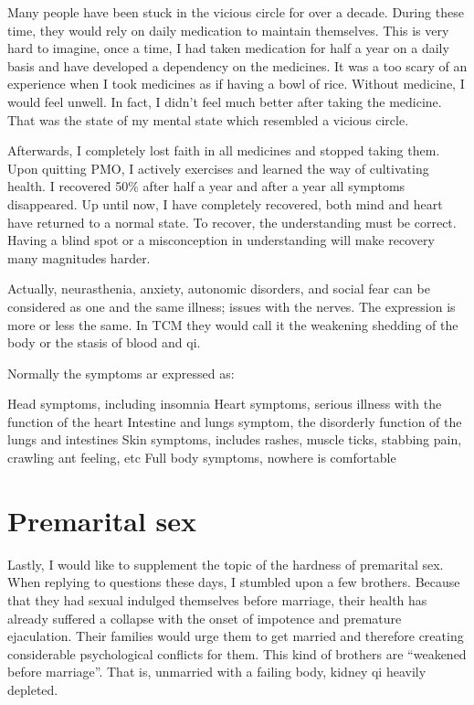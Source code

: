 \documentclass[
]{book}
\begin{document}
Many people have been stuck in the vicious circle for over a decade. During these time, they would rely on daily medication to maintain themselves. This is very hard to imagine, once a time, I had taken medication for half a year on a daily basis and have developed a dependency on the medicines. It was a too scary of an experience when I took medicines as if having a bowl of rice. Without medicine, I would feel unwell. In fact, I didn't feel much better after taking the medicine. That was the state of my mental state which resembled a vicious circle.

Afterwards, I completely lost faith in all medicines and stopped taking them. Upon quitting PMO, I actively exercises and learned the way of cultivating health. I recovered 50\% after half a year and after a year all symptoms disappeared. Up until now, I have completely recovered, both mind and heart have returned to a normal state. To recover, the understanding must be correct. Having a blind spot or a misconception in understanding will make recovery many magnitudes harder.

Actually, neurasthenia, anxiety, autonomic disorders, and social fear can be considered as one and the same illness; issues with the nerves. The expression is more or less the same. In TCM they would call it the weakening shedding of the body or the stasis of blood and qi.

Normally the symptoms ar expressed as:

Head symptoms, including insomnia
Heart symptoms, serious illness with the function of the heart
Intestine and lungs symptom, the disorderly function of the lungs and intestines
Skin symptoms, includes rashes, muscle ticks, stabbing pain, crawling ant feeling, etc
Full body symptoms, nowhere is comfortable

\hypertarget{premarital-sex}{%
\section{Premarital sex}\label{premarital-sex}}

Lastly, I would like to supplement the topic of the hardness of premarital sex. When replying to questions these days, I stumbled upon a few brothers. Because that they had sexual indulged themselves before marriage, their health has already suffered a collapse with the onset of impotence and premature ejaculation. Their families would urge them to get married and therefore creating considerable psychological conflicts for them. This kind of brothers are ``weakened before marriage''. That is, unmarried with a failing body, kidney qi heavily depleted.
\end{document}
